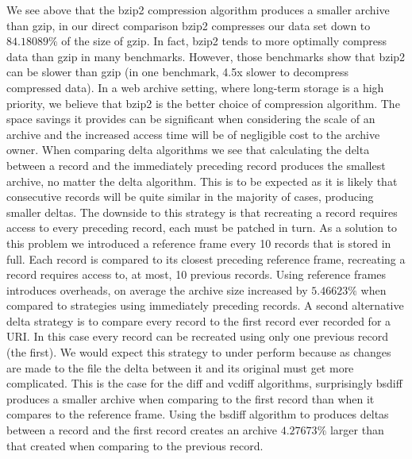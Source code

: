 \documentclass[11pt, twocolumn]{article}
\def \bzipvsgzippct {84.18089}
\def \referenceframeoverhead {5.46623}
\def \bsdifffirstoverhead {4.27673}
\begin{document}
    We see above that the bzip2 compression algorithm produces a smaller archive than gzip, in our direct comparison bzip2 compresses our data set down to $\bzipvsgzippct\%$ of the size of gzip. In fact, bzip2 tends to more optimally compress data than gzip in many benchmarks\footnotemark. However, those benchmarks show that bzip2 can be slower than gzip (in one benchmark, 4.5x slower to decompress compressed data). In a web archive setting, where long-term storage is a high priority, we believe that bzip2 is the better choice of compression algorithm. The space savings it provides can be significant when considering the scale of an archive and the increased access time will be of negligible cost to the archive owner. When comparing delta algorithms we see that calculating the delta between a record and the immediately preceding record produces the smallest archive, no matter the delta algorithm. This is to be expected as it is likely that consecutive records will be quite similar in the majority of cases, producing smaller deltas. The downside to this strategy is that recreating a record requires access to every preceding record, each must be patched in turn. As a solution to this problem we introduced a reference frame every 10 records that is stored in full. Each record is compared to its closest preceding reference frame, recreating a record requires access to, at most, 10 previous records. Using reference frames introduces overheads, on average the archive size increased by $\referenceframeoverhead\%$ when compared to strategies using immediately preceding records. A second alternative delta strategy is to compare every record to the first record ever recorded for a URI. In this case every record can be recreated using only one previous record (the first). We would expect this strategy to under perform because as changes are made to the file the delta between it and its original must get more complicated. This is the case for the diff and vcdiff algorithms, surprisingly bsdiff produces a smaller archive when comparing to the first record than when it compares to the reference frame. Using the bsdiff algorithm to produces deltas between a record and the first record creates an archive $\bsdifffirstoverhead\%$ larger than that created when comparing to the previous record.


\end{document}
